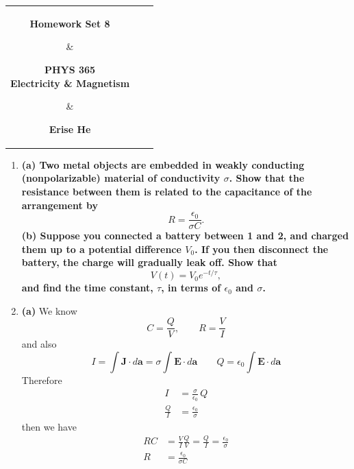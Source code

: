 \documentclass[12pt]{article}
\begin{document}
\thispagestyle{plain}
\vspace{-4ex}  %


\begin{center}
\begin{tabular}{*{3}{c}}
    \parbox[t]{0.3\linewidth}{\centering\textbf{Homework Set 8}}
    & \parbox[t]{0.3\linewidth}{\centering\textbf{PHYS 365\\Electricity \& Magnetism}}
    & \parbox[t]{0.3\linewidth}{\centering\textbf{Erise He}}\\[2em]
    \hline
\end{tabular}
\end{center}

\bigskip

\begin{enumerate}
  \item[P7.3] \textbf{(a) Two metal objects are embedded in weakly conducting (nonpolarizable) material of conductivity $\sigma$. Show that the resistance between them is related to the capacitance of the arrangement by}
  \[
  R=\frac{\epsilon_0}{\sigma C}.
  \]
  \textbf{(b) Suppose you connected a battery between 1 and 2, and charged them up to a potential difference $V_0$. If you then disconnect the battery, the charge will gradually leak off. Show that}
  \[
  V(t)=V_0 e^{-t/\tau},
  \]
  \textbf{and find the time constant, $\tau$, in terms of $\epsilon_0$ and $\sigma$.}

  \item[Solution]

  \medskip
  \textbf{(a)}
  We know 
  \[
  C=\frac{Q}{V},\qquad R=\frac{V}{I}
  \]
  and also 
  \[
  I=\int \mathbf J\cdot d\mathbf a
  =\sigma\int \mathbf E\cdot d\mathbf a
  \qquad
  Q=\epsilon_0\int \mathbf E\cdot d\mathbf a
  \]
  Therefore
  \[
  \begin{aligned}
  I&=\frac{\sigma}{\epsilon_0}\,Q\\
  \frac{Q}{I}&=\frac{\epsilon_0}{\sigma}
  \end{aligned}
  \]
  then we have
  \[
  \begin{aligned}
  RC
  &=\frac{V}{I}\frac{Q}{V}
  =\frac{Q}{I}
  =\frac{\epsilon_0}{\sigma}\\
  R&=\frac{\epsilon_0}{\sigma C}
  \end{aligned}
  \]
 
 


\end{enumerate}
\end{document}
